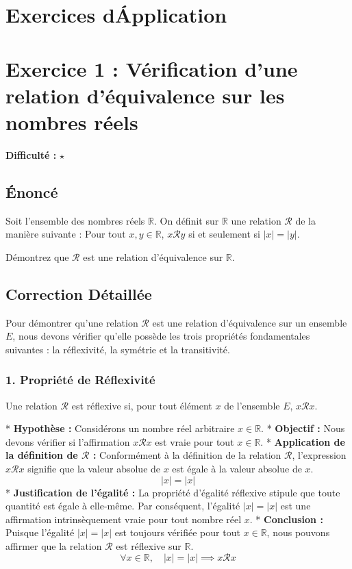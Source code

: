 \documentclass{report}
\begin{document}
\newpage
\chapter*{Exercices d\'Application}
\chapter*{Exercice 1 : Vérification d'une relation d'équivalence sur les nombres réels}
\textbf{Difficulté :} $\star$

\section*{Énoncé}
Soit l'ensemble des nombres réels $\mathbb{R}$. On définit sur $\mathbb{R}$ une relation $\mathcal{R}$ de la manière suivante :
Pour tout $x, y \in \mathbb{R}$, $x \mathcal{R} y$ si et seulement si $|x| = |y|$.

Démontrez que $\mathcal{R}$ est une relation d'équivalence sur $\mathbb{R}$.

\section*{Correction Détaillée}
Pour démontrer qu'une relation $\mathcal{R}$ est une relation d'équivalence sur un ensemble $E$, nous devons vérifier qu'elle possède les trois propriétés fondamentales suivantes : la réflexivité, la symétrie et la transitivité.

\subsection*{1. Propriété de Réflexivité}
Une relation $\mathcal{R}$ est réflexive si, pour tout élément $x$ de l'ensemble $E$, $x \mathcal{R} x$.

*   \textbf{Hypothèse :} Considérons un nombre réel arbitraire $x \in \mathbb{R}$.
*   \textbf{Objectif :} Nous devons vérifier si l'affirmation $x \mathcal{R} x$ est vraie pour tout $x \in \mathbb{R}$.
*   \textbf{Application de la définition de $\mathcal{R}$ :} Conformément à la définition de la relation $\mathcal{R}$, l'expression $x \mathcal{R} x$ signifie que la valeur absolue de $x$ est égale à la valeur absolue de $x$.
    $$ |x| = |x| $$
*   \textbf{Justification de l'égalité :} La propriété d'égalité réflexive stipule que toute quantité est égale à elle-même. Par conséquent, l'égalité $|x| = |x|$ est une affirmation intrinsèquement vraie pour tout nombre réel $x$.
*   \textbf{Conclusion :} Puisque l'égalité $|x| = |x|$ est toujours vérifiée pour tout $x \in \mathbb{R}$, nous pouvons affirmer que la relation $\mathcal{R}$ est réflexive sur $\mathbb{R}$.
    $$ \forall x \in \mathbb{R}, \quad |x| = |x| \implies x \mathcal{R} x $$
\end{document}
